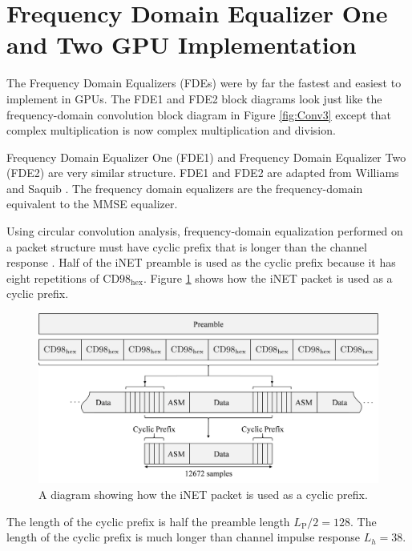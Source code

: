 \section{Frequency Domain Equalizer One and Two GPU Implementation}
The Frequency Domain Equalizers (FDEs) were by far the fastest and easiest to implement in GPUs.
The FDE1 and FDE2 block diagrams look just like the frequency-domain convolution block diagram in Figure \ref{fig:Conv3} except that complex multiplication is now complex multiplication and division.

Frequency Domain Equalizer One (FDE1) and Frequency Domain Equalizer Two (FDE2) are very similar structure.
FDE1 and FDE2 are adapted from Williams and Saquib \cite[eq. (11) and (12)]{williams2013linear} \cite{coon2006channel}.
The frequency domain equalizers are the frequency-domain equivalent to the MMSE equalizer. 

Using circular convolution analysis, frequency-domain equalization performed on a packet structure must have cyclic prefix that is longer than the channel response \cite{sari1994frequency,ng2007turbo,al2008single,proakis-salehi:2008}.
Half of the iNET preamble is used as the cyclic prefix because it has eight repetitions of $\text{CD98}_\text{hex}$.
Figure \ref{fig:cyclicPrefix} shows how the iNET packet is used as a cyclic prefix.
\begin{figure}
	\centering\includegraphics[width=9.47in/100*55]{figures/eq_equations/cyclicPrefix.pdf}
	\caption{A diagram showing how the iNET packet is used as a cyclic prefix.}
	\label{fig:cyclicPrefix}
\end{figure}
The length of the cyclic prefix is half the preamble length $L_\text{P}/2 = 128$.
The length of the cyclic prefix is much longer than channel impulse response $L_h = 38$.



